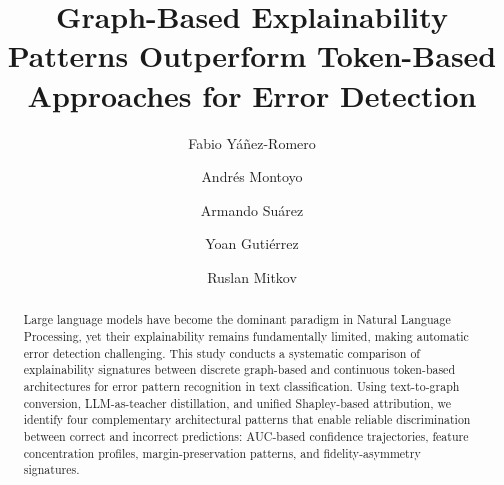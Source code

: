 \documentclass[preprint, times, review, 10pt]{elsarticle}
\begin{document}
\begin{frontmatter}

\title{Graph-Based Explainability Patterns Outperform Token-Based Approaches for Error Detection}


\author[add1,orcid=0009-0005-5494-0166]{Fabio Yáñez-Romero}

\author[add2,orcid=0000-0002-3076-0890]{Andrés Montoyo}

\author[add2,orcid=0000-0002-8590-3000]{Armando Suárez}

\author[add2,orcid=0000-0002-4052-7427]{Yoan Gutiérrez}

\author[add3,orcid=0000-0003-2522-066X]{Ruslan Mitkov}

\address[add1]{University Institute for Computer Research, University of Alicante, Carretera San Vicente del Raspeig s/n, 03690 San Vicente del Raspeig, Alicante, Spain}
\address[add2]{Department of Computing Information Systems, University of Alicante, Carretera San Vicente del Raspeig s/n, 03690 San Vicente del Raspeig, Alicante, Spain}
\address[add3]{Lancaster University, Bailrigg, Lancaster, LA1 4YW, United Kingdom}



\begin{abstract}
Large language models have become the dominant paradigm in Natural Language Processing, yet their explainability remains fundamentally limited, making automatic error detection challenging. This study conducts a systematic comparison of explainability signatures between discrete graph-based and continuous token-based architectures for error pattern recognition in text classification. Using text-to-graph conversion, LLM-as-teacher distillation, and unified Shapley-based attribution, we identify four complementary 
architectural patterns that enable reliable discrimination between correct and incorrect predictions: AUC-based confidence trajectories, feature 
concentration profiles, margin-preservation patterns, and fidelity-asymmetry signatures.


\end{abstract}
\end{frontmatter}
\end{document}
